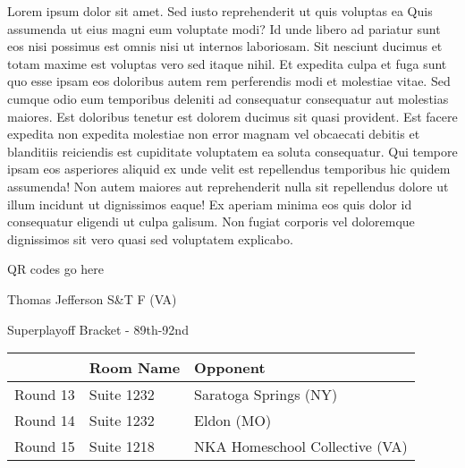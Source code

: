 \documentclass{article}%
\begin{document}
\vspace*{8pt}%
\linebreak%
\newline%
\newline%
Lorem ipsum dolor sit amet. Sed iusto reprehenderit ut quis voluptas ea Quis assumenda ut eius magni eum voluptate modi? Id unde libero ad pariatur sunt eos nisi possimus est omnis nisi ut internos laboriosam. Sit nesciunt ducimus et totam maxime est voluptas vero sed itaque nihil. Et expedita culpa et fuga sunt quo esse ipsam eos doloribus autem rem perferendis modi et molestiae vitae.\newline%
\newline%
Sed cumque odio eum temporibus deleniti ad consequatur consequatur aut molestias maiores. Est doloribus tenetur est dolorem ducimus sit quasi provident. Est facere expedita non expedita molestiae non error magnam vel obcaecati debitis et blanditiis reiciendis est cupiditate voluptatem ea soluta consequatur. Qui tempore ipsam eos asperiores aliquid ex unde velit est repellendus temporibus hic quidem assumenda!\newline%
\newline%
Non autem maiores aut reprehenderit nulla sit repellendus dolore ut illum incidunt ut dignissimos eaque! Ex aperiam minima eos quis dolor id consequatur eligendi ut culpa galisum. Non fugiat corporis vel doloremque dignissimos sit vero quasi sed voluptatem explicabo.\newline%
\newline%
%
\vspace*{30pt}%
\begin{center}%
\begin{Huge}%
QR codes go here%
\end{Huge}%
\end{center}%
\newpage%
\begin{center}%
\begin{Huge}%
Thomas Jefferson S\&T F (VA)%
\end{Huge}%
\vspace*{8pt}%
\linebreak%
\begin{Large}%
Superplayoff Bracket {-} 89th{-}92nd%
\end{Large}%
\end{center}%
%
\begin{tabularx}{\textwidth}{|c|Y|Y|}%
\hline%
&Room Name&Opponent\\%
\hline%
Round 13&Suite 1232&Saratoga Springs (NY)\\%
Round 14&Suite 1232&Eldon (MO)\\%
Round 15&Suite 1218&NKA Homeschool Collective (VA)\\%
\hline%
\end{tabularx}%
\end{document}
